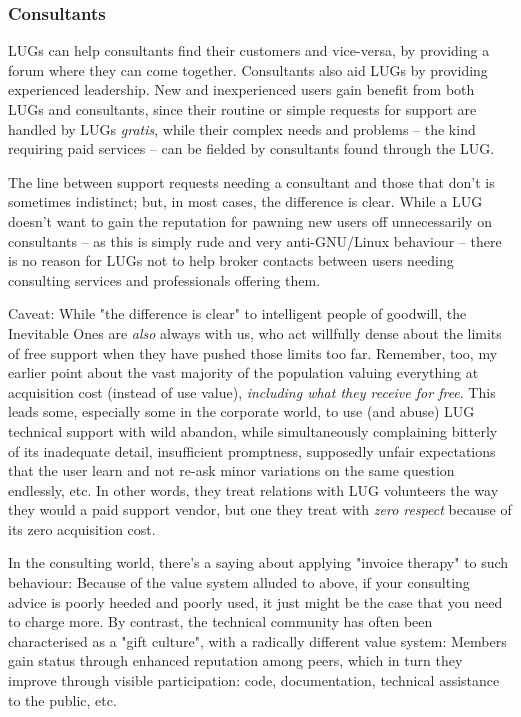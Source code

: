 \subsubsection{Consultants}



LUGs can help consultants find their customers and vice-versa,
by providing a forum where they can come together.
Consultants also aid LUGs by providing experienced leadership.
New and inexperienced users gain benefit from both LUGs and
consultants, since their routine or simple requests for support are
handled by LUGs {\itshape gratis\/}, while their complex needs and problems --
the kind requiring paid services -- can be fielded by consultants found 
through the LUG.

The line between support requests needing a consultant and those
that don't is sometimes indistinct; but, in most cases, the difference
is clear. While a LUG doesn't want to gain the reputation for
pawning new users off unnecessarily on consultants -- as this is simply
rude and very anti-GNU/Linux behaviour -- there is no reason for LUGs not to
help broker contacts between users needing consulting services and
professionals offering them.

Caveat:  While "the difference is clear" to intelligent people of goodwill,
the Inevitable Ones are {\itshape also\/} always with us, who act willfully
dense about the limits of free support when they have pushed those
limits too far.  Remember, too, my earlier point about the vast majority
of the population valuing everything at acquisition cost (instead of use
value), {\itshape including what they receive for free\/}.  This leads some,
especially some in the corporate world, to use (and abuse) LUG
technical support with wild abandon, while simultaneously complaining
bitterly of its inadequate detail, insufficient promptness, supposedly
unfair expectations that the user learn and not re-ask minor variations on
the same question endlessly, etc.  In other words, they treat relations
with LUG volunteers the way they would a paid support vendor, but one
they treat with {\itshape zero respect\/} because of its zero acquisition
cost.

In the consulting world, there's a saying about applying "invoice therapy" 
to such behaviour:  Because of the value system alluded to above, if
your consulting advice is poorly heeded and poorly used, it just might
be the case that you need to charge more.  By contrast, the technical
community has often been characterised as a "gift culture", with a
radically different value system: Members gain status through enhanced
reputation among peers, which in turn they improve through visible
participation:  code, documentation, technical assistance to the public,
etc.

